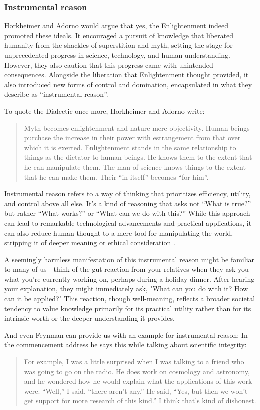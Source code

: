 \subsubsection*{Instrumental reason}
Horkheimer and Adorno would argue that yes, the Enlightenment indeed promoted
these ideals. It encouraged a pursuit of knowledge that liberated humanity from
the shackles of superstition and myth, setting the stage for unprecedented
progress in science, technology, and human understanding. However, they also
caution that this progress came with unintended consequences. Alongside the
liberation that Enlightenment thought provided, it also introduced new forms of
control and domination, encapsulated in what they describe as \enquote{instrumental
reason}.

To quote the Dialectic once more, Horkheimer and Adorno write: 
\blockquote{
  Myth becomes enlightenment and nature mere objectivity. Human
beings purchase the increase in their power with estrangement from that
over which it is exerted. Enlightenment stands in the same relationship to
things as the dictator to human beings. He knows them to the extent that
he can manipulate them. The man of science knows things to the extent
that he can make them. Their \enquote{in-itself} becomes \enquote{for him}.
}

Instrumental reason refers to a way of thinking that prioritizes efficiency,
utility, and control above all else. It’s a kind of reasoning that asks not
\enquote{What is true?} but rather \enquote{What works?} or \enquote{What can
we do with this?} While this approach can lead to remarkable technological
advancements and practical applications, it can also reduce human thought to a
mere tool for manipulating the world, stripping it of deeper meaning or ethical
consideration \cite{horkheimerZurKritikInstrumentellen2007}.

A seemingly harmless manifestation of this instrumental reason might be
familiar to many of us—think of the gut reaction from your relatives when they
ask you what you’re currently working on, perhaps during a holiday dinner.
After hearing your explanation, they might immediately ask, "What can you do
with it? How can it be applied?" This reaction, though well-meaning, reflects a
broader societal tendency to value knowledge primarily for its practical
utility rather than for its intrinsic worth or the deeper understanding it
provides.

And even Feynman can provide us with an example for instrumental reason: In the
commencement address he says this while talking about scientific integrity:
\blockquote{ For
example, I was a little surprised when I was talking to a friend who was going
to go on the radio. He does work on cosmology and astronomy, and he wondered
how he would explain what the applications of this work were. \enquote{Well,}
I said, \enquote{there aren't any.} He said, \enquote{Yes, but then we won't
get support for more research of this kind.} I think that's kind of dishonest.}

